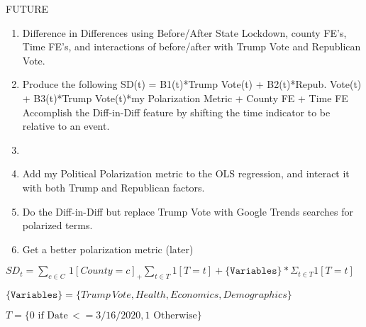 \documentclass{article}
\begin{document}
FUTURE

\begin{enumerate}
	\item Difference in Differences using Before/After State Lockdown, county FE's, Time FE's, and interactions of before/after with Trump Vote and Republican Vote.
	\item Produce the following SD(t) = B1(t)*Trump Vote(t) + B2(t)*Repub. Vote(t) + B3(t)*Trump Vote(t)*my Polarization Metric + County FE + Time FE
	Accomplish the Diff-in-Diff feature by shifting the time indicator to be relative to an event.
	\item 
	
	\item Add my Political Polarization metric to the OLS regression, and interact it with both Trump
	and Republican factors.
	
	\item Do the Diff-in-Diff but replace Trump Vote with Google Trends searches for polarized terms.
	
	\item Get a better polarization metric (later)
\end{enumerate}

\newpage
$ SD_t = \sum_{c \in C} \, 1[County = c]_ + \sum_{t \in T} 1[T = t] + \mathtt{\{Variables\}} * \Sigma_{t \in T} 1[T = t] $

\vspace{0.5cm}

$ \mathtt{\{Variables\}} = \{Trump \, Vote, Health, Economics, Demographics\} $

\vspace{0.5cm}

$ T = \{ 0 \,\, \textrm{if Date} \,<= 3/16/2020, 1 \,\, \textrm{Otherwise}  \} $
\end{document}
